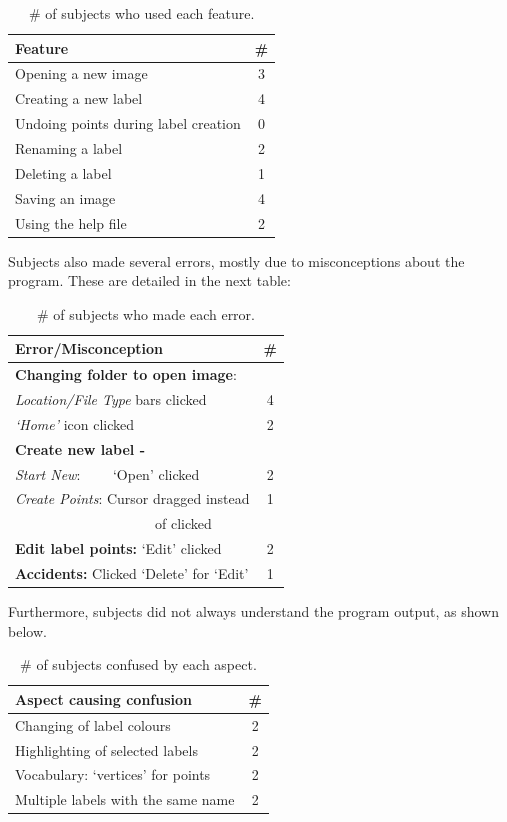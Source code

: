 \documentclass[11pt,twocolumn]{article}
\begin{document}
\begin{table}[h!]
\centering
\begin{tabular}{|l|c|}
\hline
{\bf Feature } & {\bf \# } \\ 
\hline
Opening a new image & 3 \\
Creating a new label & 4 \\
Undoing points during label creation & 0 \\
Renaming a label & 2 \\
Deleting a label & 1 \\
Saving an image & 4 \\
Using the help file & 2 \\
\hline
\end{tabular}
\caption{\# of subjects who used each feature.}
\label{features}
\end{table}
 
Subjects also made several errors, mostly due to misconceptions about the program. These are detailed in the next table:

\begin{table}[h!]
\centering
\begin{tabular}{|l|c|}
\hline
{\bf Error/Misconception} & {\bf \#} \\
\hline
{\bf Changing folder to open image}: & \\
\emph{Location/File Type} bars clicked & 4 \\
\emph{`Home'} icon clicked & 2 \\
\hline
{\bf Create new label -} & \\
\emph{Start New}: \ \ \ \ `Open' clicked & 2 \\
\emph{Create Points}: Cursor dragged  instead & 1 \\
\ \ \ \ \ \ \ \ \ \ \ \  \ \ \ \ \ \ \ \ of clicked & \\
\hline
{\bf Edit label points:} `Edit' clicked & 2 \\
\hline
{\bf Accidents:} Clicked `Delete' for `Edit' & 1 \\
\hline
\end{tabular}
\caption{\# of subjects who made each error.}
\label{errors}
\end{table}

Furthermore, subjects did not always understand the program output, as shown below.

\begin{table}[h!]
\centering
\begin{tabular}{|l|c|}
\hline
{\bf Aspect causing confusion} & {\bf \#} \\
\hline
Changing of label colours & 2 \\
Highlighting of selected labels & 2 \\
Vocabulary: `vertices' for points & 2 \\
Multiple labels with the same name & 2 \\
\hline
\end{tabular}
\caption{\# of subjects confused by each aspect.}
\label{confusion}
\end{table}
\end{document}
